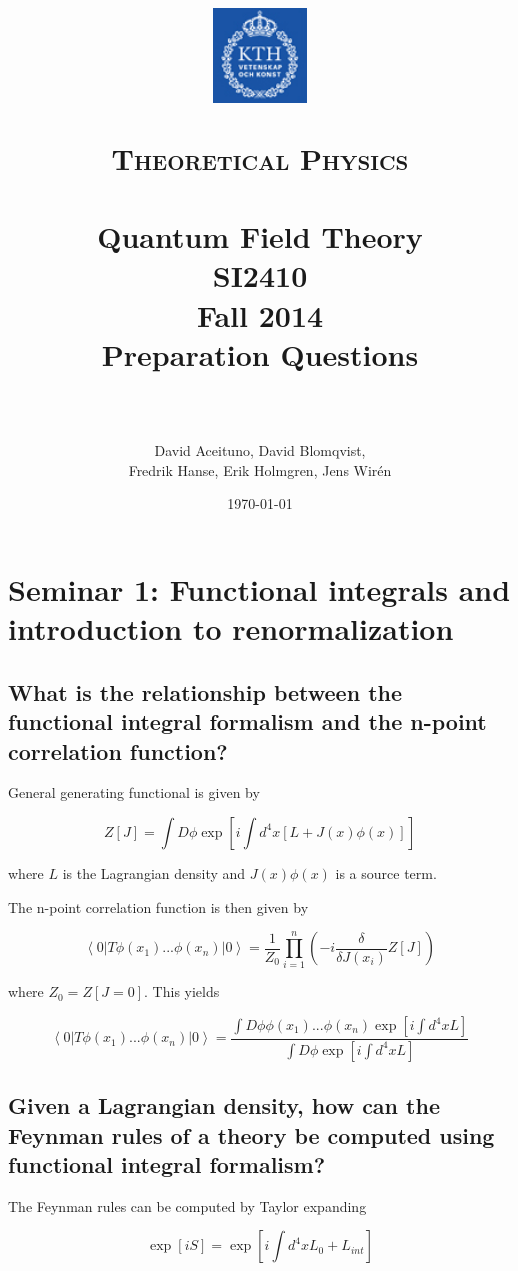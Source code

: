 \documentclass[paper=a4, fontsize=11pt]{scrartcl} %
\title{
\vspace{-2.5cm}
\begin{center}
\includegraphics[width=2.5cm]{logo-kth.png}\\[-1mm]
\hspace{-3mm}
\end{center}
\normalfont \normalsize
\textsc{Theoretical Physics} \\ [25pt] %
\horrule{0.5pt} \\[0.4cm] %
\huge Quantum Field Theory\\ %
SI2410\\ %
\huge Fall 2014\\ %
\huge Preparation Questions \\ %
\horrule{2pt} \\[0.5cm] %
}
\author{David Aceituno, David Blomqvist,
\\ Fredrik Hanse, Erik Holmgren, Jens Wir\'{e}n}
\date{\normalsize\today} %
\numberwithin{equation}{section} %
\numberwithin{figure}{section} %
\numberwithin{table}{section} %
\newcommand{\parentheses}[1]{\ensuremath{\left( #1 \right)}}
\newcommand{\commutator}[1]{\ensuremath{\left[ #1 \right]}}
\begin{document}
\maketitle %


\section{Seminar 1: Functional integrals and introduction to renormalization}

\subsection{What is the relationship between the functional integral formalism and
the n-point correlation function?}
General generating functional is given by

\begin{equation}
Z[J]=\int D\phi \exp \left[i\int d^4x[L+J(x)\phi(x)] \right]
\end{equation}

where $L$ is the Lagrangian density and $J(x)\phi(x)$ is a source term.

The n-point correlation function is then given by

\begin{equation}
\left\langle 0 | T \phi (x_1) ... \phi (x_n) | 0 \right\rangle = \dfrac{1}{Z_0} \prod_{i=1}^{n} \parentheses{-i\dfrac{\delta}{\delta J(x_i)} Z[J]}
\end{equation}

where $Z_0=Z[J=0]$. This yields

\begin{equation}
\left\langle 0 | T \phi (x_1) ... \phi (x_n) | 0 \right\rangle = \dfrac{\int D\phi \phi(x_1)...\phi(x_n) \exp \left[i\int d^4xL \right]}{\int D\phi \exp \left[i\int d^4xL \right]}
\end{equation}

\subsection{Given a Lagrangian density, how can the Feynman rules of a theory be
computed using functional integral formalism?}
The Feynman rules can be computed by Taylor expanding

\begin{equation}
\exp [iS] = \exp \commutator{i \int d^4 x L_0 + L_{int}}
\end{equation}
\end{document}
